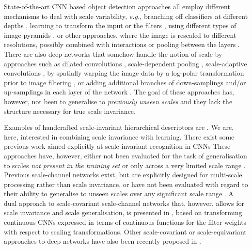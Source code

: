 \documentclass[twocolumn,runningheads]{svjour3}
\begin{document}
State-of-the-art CNN based object detection approaches 
all employ different mechanisms to deal with scale variability, 
{\em e.g.\/}, branching off classifiers at different depths
\cite{CaiFanFerVas16-ECCV}, 
learning to transform the input or the filters 
\cite{JadSimZisKav15-NIPS,LinLuc17-CVPR,HenVed17-ICML}, 
using different types of image pyramids 
\cite{SerEigZhaMatFerLeC13-arXiv,Gir15-ICCV,LinDolGirHeHarBel17-CVPR,LinGoyGirHeDol17-ICCV,HeKiDolGir17-ICCV,HuRam17-CVPR},
or other approaches, where the image is rescaled to different
resolutions, possibly combined with
interactions or pooling between the layers 
\cite{RenHeGirZhaSun16-PAMI,NahKimLee17-CVPR,ChePapKokMurYui17-PAMI,SinDav18-CVPR}.
There are also deep networks that somehow handle the notion of scale
by approaches such as dilated convolutions
\cite{YuKol16-ICLR,YuKolFun17-CVPR,MehRasCasShaHaj18-ECCV},
scale-dependent pooling \cite{YanChoLin16-CVPR},
scale-adaptive convolutions \cite{ZhaTanZhaLiYan17-ICCV},
by spatially warping the image data by a log-polar transformation
prior to image filtering \cite{HenVed17-ICML,EstAllZhoDan18-ICLR},
 or
adding additional branches of down-samp\-lings and/or up-samplings in each
layer of the network \cite{WanKemFarYuiRas19-CVPR,CheFanXuYanKalRohYanFen19-ICCV}.
The goal of these approaches has, however, not been to generalise to
{\em previously unseen scales\/} and they lack the structure necessary
for true scale invariance.
 
Examples of handcrafted scale-invariant hierarchical descriptors are
\cite{SifMal13-CVPR,Lin20-JMIV}. We are, here, interested in
combining scale invariance with learning. There exist some previous
work aimed explicitly at scale-invariant recognition in CNNs
\cite{XuXiaZhaYanZha14-arXiv,KanShaJac14-arXiv,MarKelLobTui18-arXiv,GhoGup19-arXiv,WorWel19-NeuroIPS}
These
approaches have, however, either not been evaluated for the task of
generalisation to scales {\em not present in the training set\/}
\cite{KanShaJac14-arXiv,MarKelLobTui18-arXiv,WorWel19-NeuroIPS} or only
across a very limited scale range
\cite{XuXiaZhaYanZha14-arXiv,GhoGup19-arXiv}. Previous scale-channel networks exist,
but are explicitly designed for multi-scale processing
\cite{FarCouNajLeC13-PAMI,NooPos16-PR} rather than scale invariance,
or have not been evaluated with regard to their ability to generalise to
unseen scales over any significant scale range
\cite{SerEigZhaMatFerLeC13-arXiv,XuXiaZhaYanZha14-arXiv}. 
A dual approach to scale-covariant scale-channel networks that, however, allows for
scale invariance and scale generalisation, is presented in
\cite{Lin21-SSVM,Lin22-JMIV}, based on transforming continuous CNNs expressed in
terms of continuous functions for the filter weights with respect to
scaling transformations.
Other scale-covariant or scale-equivariant approaches to deep networks have
also been recently proposed in \cite{Bek20-ICLR,SosSzmSme20-ICLR,ZhuQiuCalSapChe19-arXiv,SosMosSme21-BMVC}.
\end{document}
